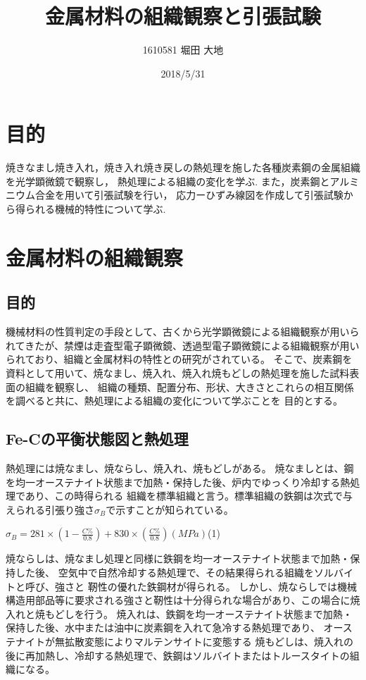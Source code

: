 \documentclass[10pt,a4j]{jsarticle}
\title{\vspace{-2.5cm}金属材料の組織観察と引張試験}
\author{1610581 堀田 大地}
\date{2018/5/31}
\begin{document}
\maketitle{}
\section{目的}
焼きなまし焼き入れ，焼き入れ焼き戻しの熱処理を施した各種炭素鋼の金属組織を光学顕微鏡で観察し，
熱処理による組織の変化を学ぶ.
また，炭素鋼とアルミニウム合金を用いて引張試験を行い，
応力ーひずみ線図を作成して引張試験から得られる機械的特性について学ぶ.
\section{金属材料の組織観察}
  \subsection{目的}
  機械材料の性質判定の手段として、古くから光学顕微鏡による組織観察が用いられてきたが、禁煙は走査型電子顕微鏡、透過型電子顕微鏡による組織観察が用いられており、組織と金属材料の特性との研究がされている。
  そこで、炭素鋼を資料として用いて、焼なまし、焼入れ、焼入れ焼もどしの熱処理を施した試料表面の組織を観察し、
  組織の種類、配置分布、形状、大きさとこれらの相互関係を調べると共に、熱処理による組織の変化について学ぶことを
  目的とする。
  \subsection{Fe-Cの平衡状態図と熱処理}
  熱処理には焼なまし、焼ならし、焼入れ、焼もどしがある。
  焼なましとは、鋼を均一オーステナイト状態まで加熱・保持した後、炉内でゆっくり冷却する熱処理であり、この時得られる
  組織を標準組織と言う。標準組織の鉄鋼は次式で与えられる引張り強さ$σ_{B}$で示すことが知られている。
    \begin{center}
	  $σ_{B} =281 \times (1-\frac{C\%}{0.8})+830 \times (\frac{C\%}{0.8})  (MPa)
      $\quad(1)
  \end{center}
  焼ならしは、焼なまし処理と同様に鉄鋼を均一オーステナイト状態まで加熱・保持した後、
  空気中で自然冷却する熱処理で、その結果得られる組織をソルバイトと呼び、強さと
  靭性の優れた鉄鋼材が得られる。
  しかし、焼ならしでは機械構造用部品等に要求される強さと靭性は十分得られな場合があり、この場合に焼入れと焼もどしを行う。
  焼入れは、鉄鋼を均一オーステナイト状態まで加熱・保持した後、水中または油中に炭素鋼を入れて急冷する熱処理であり、
  オーステナイトが無拡散変態によりマルテンサイトに変態する
  焼もどしは、焼入れの後に再加熱し、冷却する熱処理で、鉄鋼はソルバイトまたはトルースタイトの組織になる。
  
\end{document}
